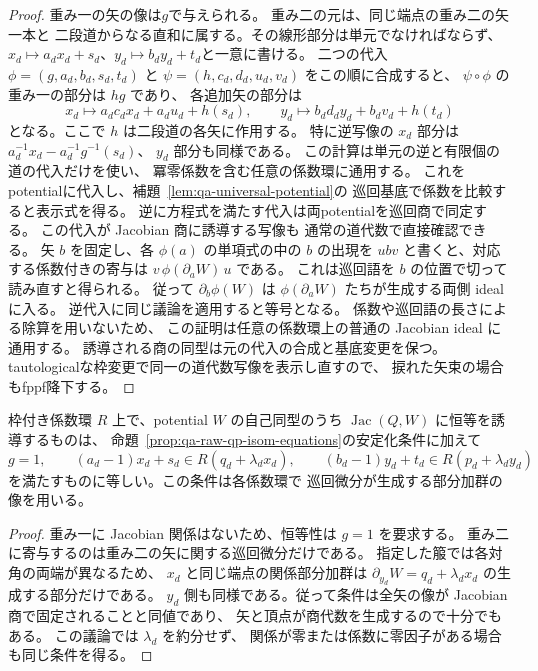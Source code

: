\begin{proof}
重み一の矢の像は$g$で与えられる。
重み二の元は、同じ端点の重み二の矢一本と
二段道からなる直和に属する。その線形部分は単元でなければならず、
$x_d\mapsto a_dx_d+s_d$、$y_d\mapsto b_dy_d+t_d$と一意に書ける。
二つの代入 $\phi=(g,a_d,b_d,s_d,t_d)$ と
$\psi=(h,c_d,d_d,u_d,v_d)$ をこの順に合成すると、
$\psi\circ\phi$ の重み一の部分は $hg$ であり、
各追加矢の部分は
\[
 x_d\longmapsto a_dc_dx_d+a_du_d+h(s_d),\qquad
 y_d\longmapsto b_dd_dy_d+b_dv_d+h(t_d)
\]
となる。ここで $h$ は二段道の各矢に作用する。
特に逆写像の $x_d$ 部分は
$a_d^{-1}x_d-a_d^{-1}g^{-1}(s_d)$、
$y_d$ 部分も同様である。
この計算は単元の逆と有限個の道の代入だけを使い、
冪零係数を含む任意の係数環に通用する。
これをpotentialに代入し、補題~\ref{lem:qa-universal-potential}の
巡回基底で係数を比較すると表示式を得る。
逆に方程式を満たす代入は両potentialを巡回商で同定する。
この代入が Jacobian 商に誘導する写像も
通常の道代数で直接確認できる。
矢 $b$ を固定し、各 $\phi(a)$ の単項式の中の $b$ の出現を
$u b v$ と書くと、対応する係数付きの寄与は
$v\,\phi(\partial_a W)\,u$ である。
これは巡回語を $b$ の位置で切って読み直すと得られる。
従って $\partial_b\phi(W)$ は
$\phi(\partial_a W)$ たちが生成する両側 ideal に入る。
逆代入に同じ議論を適用すると等号となる。
係数や巡回語の長さによる除算を用いないため、
この証明は任意の係数環上の普通の Jacobian ideal に通用する。
誘導される商の同型は元の代入の合成と基底変更を保つ。
tautologicalな枠変更で同一の道代数写像を表示し直すので、
捩れた矢束の場合もfppf降下する。
\end{proof}

\begin{corollary}
枠付き係数環 $R$ 上で、potential $W$ の自己同型のうち
$\operatorname{Jac}(Q,W)$ に恒等を誘導するものは、
命題~\ref{prop:qa-raw-qp-isom-equations}の安定化条件に加えて
\[
 g=1,\qquad
 (a_d-1)x_d+s_d\in R(q_d+\lambda_d x_d),\qquad
 (b_d-1)y_d+t_d\in R(p_d+\lambda_d y_d)
\]
を満たすものに等しい。この条件は各係数環で
巡回微分が生成する部分加群の像を用いる。
\end{corollary}
\begin{proof}
重み一に Jacobian 関係はないため、恒等性は $g=1$ を要求する。
重み二に寄与するのは重み二の矢に関する巡回微分だけである。
指定した箙では各対角の両端が異なるため、
$x_d$ と同じ端点の関係部分加群は
$\partial_{y_d}W=q_d+\lambda_dx_d$ の生成する部分だけである。
$y_d$ 側も同様である。従って条件は全矢の像が
Jacobian 商で固定されることと同値であり、
矢と頂点が商代数を生成するので十分でもある。
この議論では $\lambda_d$ を約分せず、
関係が零または係数に零因子がある場合も同じ条件を得る。
\end{proof}

